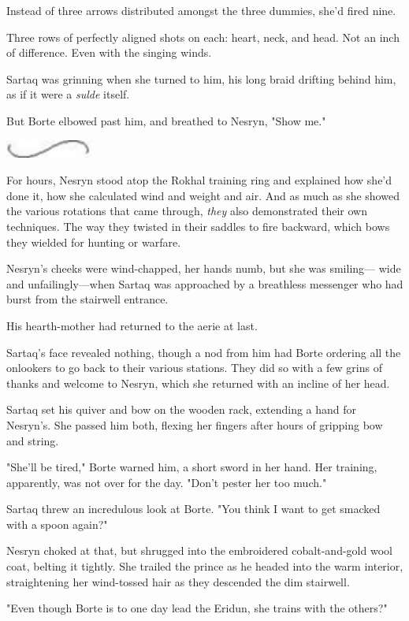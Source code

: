 Instead of three arrows distributed amongst the three dummies, she'd fired nine.

Three rows of perfectly aligned shots on each: heart, neck, and head. Not an inch of difference. Even with the singing winds.

Sartaq was grinning when she turned to him, his long braid drifting behind him, as if it were a \emph{sulde} itself.

But Borte elbowed past him, and breathed to Nesryn, "Show me."

\includegraphics[width=1.12in,height=0.24in]{images/seperator}

For hours, Nesryn stood atop the Rokhal training ring and explained how she'd done it, how she calculated wind and weight and air. And as much as she showed the various rotations that came through, \emph{they} also demonstrated their own techniques. The way they twisted in their saddles to fire backward, which bows they wielded for hunting or warfare.

Nesryn's cheeks were wind-chapped, her hands numb, but she was smiling--- wide and unfailingly---when Sartaq was approached by a breathless messenger who had burst from the stairwell entrance.

His hearth-mother had returned to the aerie at last.

Sartaq's face revealed nothing, though a nod from him had Borte ordering all the onlookers to go back to their various stations. They did so with a few grins of thanks and welcome to Nesryn, which she returned with an incline of her head.

Sartaq set his quiver and bow on the wooden rack, extending a hand for Nesryn's. She passed him both, flexing her fingers after hours of gripping bow and string.

"She'll be tired," Borte warned him, a short sword in her hand. Her training, apparently, was not over for the day. "Don't pester her too much."

Sartaq threw an incredulous look at Borte. "You think I want to get smacked with a spoon again?"

Nesryn choked at that, but shrugged into the embroidered cobalt-and-gold wool coat, belting it tightly. She trailed the prince as he headed into the warm interior, straightening her wind-tossed hair as they descended the dim stairwell.

"Even though Borte is to one day lead the Eridun, she trains with the others?"

